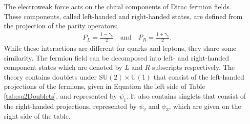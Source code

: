 The electroweak force acts on the chiral components of Dirac fermion fields.
These components, called left-handed and right-handed states, are defined from the projection of the parity operators:
\begin{equation}\begin{split}\label{eqn:chiralOps}
P_L=\frac{1-\gamma_5}{2} \quad\text{and}\quad
P_R=\frac{1+\gamma_5}{2}.
\end{split}\end{equation}
While these interactions are different for quarks and leptons, they share some similarity.
The fermion field can be decomposed into left- and right-handed component states which are denoted by $L$ and $R$ subscripts respectively.
The theory contains doublets under $\text{SU}(2)\times\text{U}(1)$ that consist of the left-handed projections of the fermions, given in Equation the left side of Table \ref{tab:su2Doublets}, and represented by $\psi_1$.
It also contains singlets that consist of the right-handed projections, represented by $\psi_2$ and $\psi_3$, which are given on the right side of the table.
